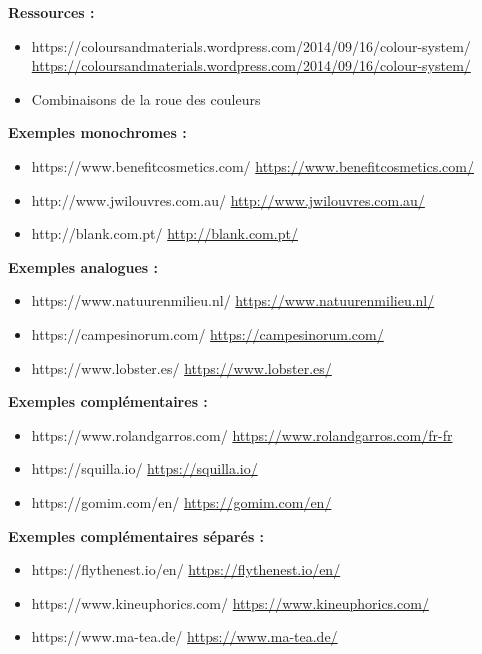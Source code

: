 \textbf{Ressources :}

\begin{itemize}
\item https://coloursandmaterials.wordpress.com/2014/09/16/colour-system/ \url{https://coloursandmaterials.wordpress.com/2014/09/16/colour-system/}
\item Combinaisons de la roue des couleurs
\end{itemize}

\textbf{Exemples monochromes :}

\begin{itemize}
\item https://www.benefitcosmetics.com/ \url{https://www.benefitcosmetics.com/}
\item http://www.jwilouvres.com.au/ \url{http://www.jwilouvres.com.au/}
\item http://blank.com.pt/ \url{http://blank.com.pt/}
\end{itemize}

\textbf{Exemples analogues :}

\begin{itemize}
\item https://www.natuurenmilieu.nl/ \url{https://www.natuurenmilieu.nl/}
\item https://campesinorum.com/ \url{https://campesinorum.com/}
\item https://www.lobster.es/ \url{https://www.lobster.es/}
\end{itemize}

\textbf{Exemples complémentaires :}

\begin{itemize}
\item https://www.rolandgarros.com/ \url{https://www.rolandgarros.com/fr-fr}
\item https://squilla.io/ \url{https://squilla.io/}
\item https://gomim.com/en/ \url{https://gomim.com/en/}
\end{itemize}

\textbf{Exemples complémentaires séparés :}

\begin{itemize}
\item https://flythenest.io/en/ \url{https://flythenest.io/en/}
\item https://www.kineuphorics.com/ \url{https://www.kineuphorics.com/}
\item https://www.ma-tea.de/ \url{https://www.ma-tea.de/}
\end{itemize}

